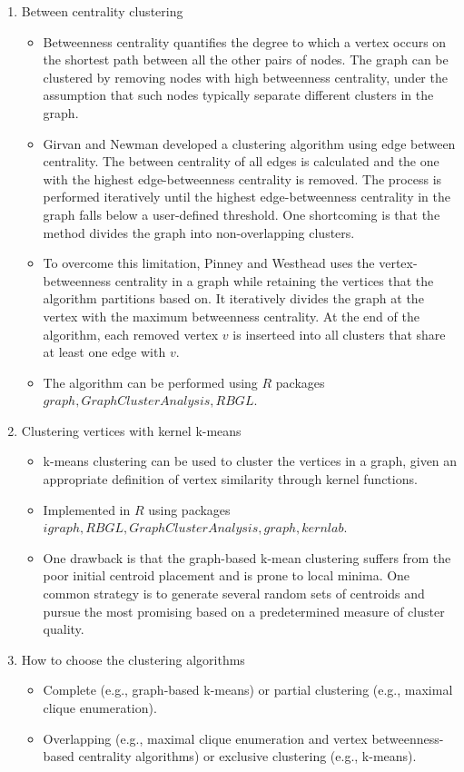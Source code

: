 \documentclass[14pt]{article}
\begin{document}
\begin{enumerate}
  \item Between centrality clustering
   \begin{itemize}
    \item Betweenness centrality quantifies the degree to which a vertex occurs on the shortest path between all the other pairs of nodes. The graph can be clustered by removing nodes with high betweenness centrality, under the assumption that such nodes typically separate different clusters in the graph. 
    \item Girvan and Newman developed a clustering algorithm using edge between centrality. The between centrality of all edges is calculated and the one with the highest edge-betweenness centrality is removed. The process is performed iteratively until the highest edge-betweenness centrality in the graph falls below a user-defined threshold. One shortcoming is that the method divides the graph into non-overlapping clusters.
    \item To overcome this limitation, Pinney and Westhead uses the vertex-betweenness centrality in a graph while retaining the vertices that the algorithm partitions based on. It iteratively divides the graph at the vertex with the maximum betweenness centrality. At the end of the algorithm, each removed vertex $v$ is inserteed into all clusters that share at least one edge with $v$.
    \item The algorithm can be performed using $R$ packages $graph, GraphClusterAnalysis, RBGL$.
   \end{itemize}
  
  \item Clustering vertices with kernel k-means
   \begin{itemize}
    \item k-means clustering can be used to cluster the vertices in a graph, given an appropriate definition of vertex similarity through kernel functions.
    \item Implemented in $R$ using packages $igraph, RBGL, GraphClusterAnalysis, graph, kernlab$.
    \item One drawback is that the graph-based k-mean clustering suffers from the poor initial centroid placement and is prone to local minima. One common strategy is to generate several random sets of centroids and pursue the most promising based on a predetermined measure of cluster quality. 
   \end{itemize}
   
  \item How to choose the clustering algorithms
   \begin{itemize}
    \item Complete (e.g., graph-based k-means) or partial clustering (e.g., maximal clique enumeration).
    \item Overlapping (e.g., maximal clique enumeration and vertex betweenness-based centrality algorithms) or exclusive clustering (e.g., k-means).
   \end{itemize}
\end{enumerate}
\end{document}
